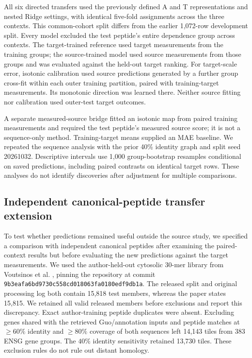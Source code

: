 \documentclass[11pt,a4paper]{article}
\begin{document}
All six directed transfers used the previously defined A and T representations
and nested Ridge settings, with identical five-fold assignments across the
three contexts. This common-cohort split differs from the earlier
1,072-row development split. Every model excluded the test peptide's entire dependence
group across contexts. The target-trained reference used target measurements
from the training groups; the source-trained model used source measurements
from those groups and was evaluated against the held-out target ranking.
For target-scale error, isotonic calibration used source predictions generated
by a further group cross-fit within each outer training partition,
paired with training-target measurements. Its monotonic direction was learned
there. Neither source fitting nor calibration used outer-test target outcomes.

A separate measured-source bridge fitted an isotonic map from paired
training measurements and required the test peptide's measured source score;
it is not a sequence-only method. Training-target means supplied an MAE
baseline. We repeated the sequence analysis with the prior 40\% identity
graph and split seed 20261032. Descriptive intervals use 1,000 group-bootstrap
resamples conditional on saved predictions, including paired contrasts on
identical target rows. These analyses do not identify discoveries after adjustment for multiple comparisons.

\subsection{Independent canonical-peptide transfer extension}
To test whether predictions remained useful outside the source study,
we specified a comparison with independent canonical peptides after examining
the paired-context results but before evaluating the new predictions against
the target measurements. We used the
author-held-out cytosolic 30-mer library from Voutsinos et al. \cite{voutsinos},
pinning the repository at commit
\texttt{9b3eafa6bd9730c558cd018063fa0180edf9db1a}.
The released split and original processing log both contain 15,818 test
members, whereas the paper states 15,815. We retained all valid released
members before exclusions and report this discrepancy. Exact author-training
peptide duplicates were absent. Excluding genes shared with the retrieved
Guo/annotation inputs and peptide matches at $\geq60\%$ identity and
$\geq80\%$ coverage of both sequences left 14,143 tiles from 383 ENSG
gene groups. The $40\%$ identity sensitivity retained 13,730 tiles. These exclusion rules do not rule out distant homology.
\end{document}
